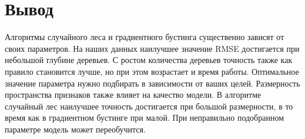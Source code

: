 \documentclass[a4paper, 12pt]{report}
\begin{document}
\chapter{Вывод}
    Алгоритмы случайного леса и градиентного бустинга существенно зависят от своих параметров. На наших данных наилучшее значение RMSE достигается при небольшой глубине деревьев. С ростом количества деревьев точность также как правило становится лучше, но при этом возрастает и время работы. Оптимальное значение параметра нужно подбирать в зависимости от ваших целей. 
    Размерность пространства признаков также влияет на качество модели. В алгоритме случайный лес наилучшее точность достигается при большой размерности, в то время как в градиентном бустинге при малой. При неправильно подобранном параметре модель может переобучится.  
\end{document}
